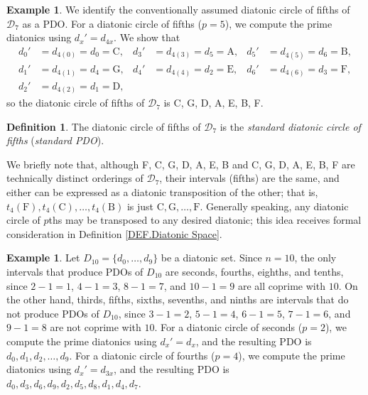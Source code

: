 \documentclass{article}
\theoremstyle{plain}
\theoremstyle{definition}
\newtheorem{definition}[theorem]{Definition}
\newtheorem{example}[theorem]{Example}
\theoremstyle{remark}
\begin{document}
\begin{example}
	We identify the conventionally assumed diatonic circle of fifths of $\mathcal{D}_7$ as a PDO. For a diatonic circle of fifths ($p=5$), we compute the prime diatonics using $d_x'=d_{4x}$. We show that \begin{align*} d_0' &= d_{4(0)}=d_0=\textrm{C}, & d_3' &= d_{4(3)}=d_5=\textrm{A}, & d_5' &= d_{4(5)}=d_6=\textrm{B}, \\ d_1' &= d_{4(1)}=d_4=\textrm{G}, & d_4' &= d_{4(4)}=d_2=\textrm{E}, & d_6' &= d_{4(6)}=d_3=\textrm{F}, \\ d_2' &= d_{4(2)}=d_1=\textrm{D}, \end{align*} so the diatonic circle of fifths of $\mathcal{D}_7$ is C, G, D, A, E, B, F.
\end{example}

\begin{definition}
	The diatonic circle of fifths of $\mathcal{D}_7$ is the \textit{standard diatonic circle of fifths} (\textit{standard PDO}).
\end{definition}

We briefly note that, although F, C, G, D, A, E, B and C, G, D, A, E, B, F are technically distinct orderings of $\mathcal{D}_7$, their intervals (fifths) are the same, and either can be expressed as a diatonic transposition of the other; that is, $t_4(\textrm{F}),t_4(\textrm{C}),\dots,t_4(\textrm{B})$ is just $\textrm{C},\textrm{G},\dots,\textrm{F}$. Generally speaking, any diatonic circle of $p$ths may be transposed to any desired  diatonic; this idea receives formal consideration in Definition \ref{DEF.Diatonic Space}.

\begin{example}
	Let $D_{10}=\{d_0,\dots,d_9\}$ be a diatonic set. Since $n=10$, the only intervals that produce PDOs of $D_{10}$ are seconds, fourths, eighths, and tenths, since $2-1=1$, $4-1=3$, $8-1=7$, and $10-1=9$ are all coprime with $10$. On the other hand, thirds, fifths, sixths, sevenths, and ninths are intervals that do not produce PDOs of $D_{10}$, since $3-1=2$, $5-1=4$, $6-1=5$, $7-1=6$, and $9-1=8$ are not coprime with $10$. For a diatonic circle of seconds ($p=2$), we compute the prime diatonics using $d_x'=d_x$, and the resulting PDO is $d_0,d_1,d_2,\dots,d_9$. For a diatonic circle of fourths ($p=4$), we compute the prime diatonics using $d_x'=d_{3x}$, and the resulting PDO is $d_0,d_3,d_6,d_9,d_2,d_5,d_8,d_1,d_4,d_7$.
\end{example}
\end{document}
